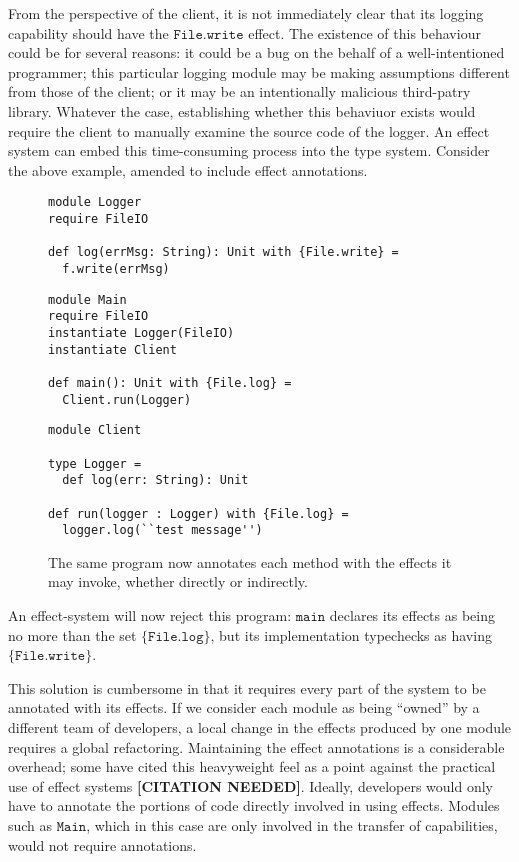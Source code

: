 \documentclass[a4paper,UKenglish]{lipics-v2016}
\newcommand{\kwa}[1]{\mathtt{ #1 }}
\begin{document}
From the perspective of the client, it is not immediately clear that its logging capability should have the $\kwa{File.write}$ effect. The existence of this behaviour could be for several reasons: it could be a bug on the behalf of a well-intentioned programmer; this particular logging module may be making assumptions different from those of the client; or it may be an intentionally malicious third-patry library. Whatever the case, establishing whether this behaviuor exists would require the client to manually examine the source code of the logger. An effect system can embed this time-consuming process into the type system. Consider the above example, amended to include effect annotations.

\begin{figure}[h]
\vspace{-5pt}
\begin{lstlisting}[mathescape]
module Logger
require FileIO

def log(errMsg: String): Unit with {File.write} =
  f.write(errMsg)
\end{lstlisting}

\begin{lstlisting}
module Main
require FileIO
instantiate Logger(FileIO)
instantiate Client

def main(): Unit with {File.log} =
  Client.run(Logger)
\end{lstlisting}

\begin{lstlisting}
module Client

type Logger =
  def log(err: String): Unit

def run(logger : Logger) with {File.log} =
  logger.log(``test message'')
\end{lstlisting}

\vspace{-7pt}
\caption{The same program now annotates each method with the effects it may invoke, whether directly or indirectly. }
\label{f-resource-modules}
\end{figure}

An effect-system will now reject this program: $\kwa{main}$ declares its effects as being no more than the set $\kwa{ \{File.log\} }$, but its implementation typechecks as having $\kwa{ \{File.write\} }$.

This solution is cumbersome in that it requires every part of the system to be annotated with its effects. If we consider each module as being ``owned'' by a different team of developers, a local change in the effects produced by one module requires a global refactoring. Maintaining the effect annotations is a considerable overhead; some have cited this heavyweight feel as a point against the practical use of effect systems \textbf{[CITATION NEEDED]}. Ideally, developers would only have to annotate the portions of code directly involved in using effects. Modules such as $\kwa{Main}$, which in this case are only involved in the transfer of capabilities, would not require annotations.
\end{document}
